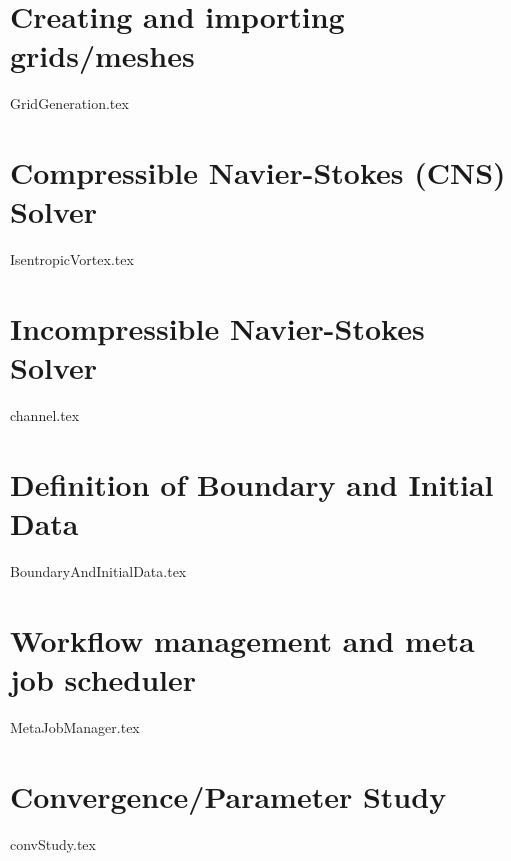 \documentclass[a4paper,10pt]{report} %
\begin{document}
\chapter{Creating and importing grids/meshes }
\label{sec:GridCreation}
{GridGeneration.tex}

\chapter{Compressible Navier-Stokes (CNS) Solver }
\label{sec:CNS}
{IsentropicVortex.tex}

\chapter{Incompressible Navier-Stokes Solver}
\label{sec:IBM}
{channel.tex}


\chapter{Definition of Boundary and Initial Data}
\label{sec:BoundaryAndInitialData}
{BoundaryAndInitialData.tex}

\chapter{Workflow management and meta job scheduler}
\label{sec:WorkflowMgm}
{MetaJobManager.tex}

\chapter{Convergence/Parameter Study}
\label{sec:Parameterstudy}
{convStudy.tex}
\end{document}
